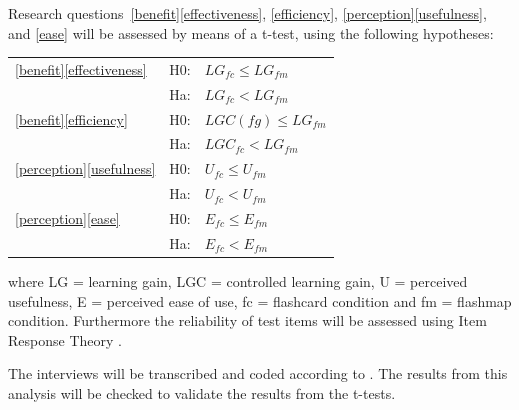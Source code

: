 
Research questions~\ref{benefit}\ref{effectiveness}, \ref{efficiency}, \ref{perception}\ref{usefulness}, and \ref{ease} will be assessed by means of a t-test, using the following hypotheses: 

\begin{tabular}{l l l}
\ref{benefit}\ref{effectiveness} & H0: & $LG_{fc} \leq LG_{fm}$ \\
                                 & Ha: & $LG_{fc} < LG_{fm}$ \\
\ref{benefit}\ref{efficiency}    & H0: & $LGC(fg) \leq LG_{fm}$ \\
                                 & Ha: & $ LGC_{fc} < LG_{fm}$ \\
\ref{perception}\ref{usefulness} & H0: & $U_{fc} \leq U_{fm}$ \\
                                 & Ha: & $U_{fc} < U_{fm}$ \\
\ref{perception}\ref{ease}       & H0: & $E_{fc} \leq E_{fm}$ \\
                                 & Ha: & $E_{fc} < E_{fm}$ \\
\end{tabular}

\noindent where LG = learning gain, LGC = controlled learning gain, U = perceived usefulness, E = perceived ease of use, fc = flashcard condition and fm = flashmap condition. Furthermore the reliability of test items will be assessed using Item Response Theory \cite{irt}.

The interviews will be transcribed and coded according to . The results from this analysis will be checked to validate the results from the t-tests. 

